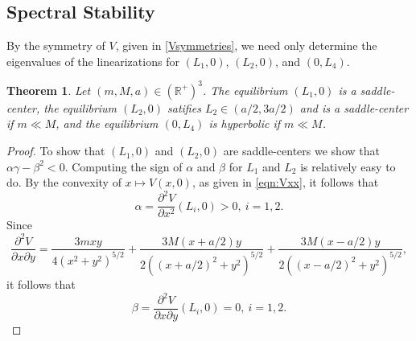 \documentclass[12pt]{article}
\newtheorem{theorem}{Theorem}
\begin{document}
\subsection{Spectral Stability}
By the symmetry of $V$, given in \eqref{Vsymmetries}, we need only determine the eigenvalues of the linearizations for $(L_1,0)$, $(L_2,0)$, and $(0,L_4)$. 

\begin{theorem}\label{thmSpectralStability} 
Let $(m,M,a)\in ({\mathbb R}^+)^3$. The equilibrium $(L_1,0)$ is a saddle-center, the equilibrium $(L_2,0)$ satifies $L_2\in (a/2,3a/2)$ and is a saddle-center if $m\ll M$, and the equilibrium $(0,L_4)$ is hyperbolic if $m \ll M$.
\end{theorem}

\begin{proof} To show that $(L_1,0)$ and $(L_2,0)$ are saddle-centers we show that $\alpha\gamma -\beta^2<0$. Computing the sign of $\alpha$ and $\beta$ for $L_1$ and $L_2$ is relatively easy to do. By the convexity of $x\mapsto V(x,0)$, as given in \eqref{eqn:Vxx}, it follows that
\[ \alpha = \frac{\partial^2 V}{\partial x^2}(L_i,0) > 0,\ i=1,2.\]
Since 
\begin{equation}\label{eqn:partialVxy}
\frac{\partial^2 V}{\partial x\partial y} = \frac{3mxy}{4(x^2+y^2)^{5/2}} + \frac{3M(x+a/2)y}{2((x+a/2)^2+y^2)^{5/2}} + \frac{3M(x-a/2)y}{2((x-a/2)^2+y^2)^{5/2}},
\end{equation}
it follows that
\[ \beta = \frac{\partial^2 V}{\partial x\partial y}(L_i,0) = 0, \ i=1,2.\]


\end{proof}
\end{document}
